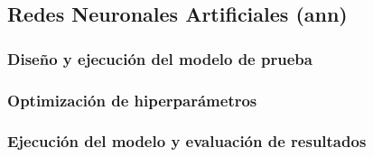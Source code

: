 \subsection{Redes Neuronales Artificiales (\acrshort{ann})}
\label{sec:ann}




\subsubsection{Diseño y ejecución del modelo de prueba}


\subsubsection{Optimización de hiperparámetros}





\subsubsection{Ejecución del modelo y evaluación de resultados}














